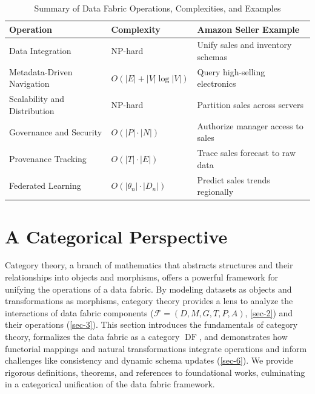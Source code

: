 \documentclass{amsart}
\newcommand\cF{\mathcal{F}}
\DeclareMathOperator\DF{DF}
\begin{document}
\begin{table}[htb]
    \centering
    \begin{tabular}{l l l}
        \hline
        \textbf{Operation} & \textbf{Complexity} & \textbf{Amazon Seller Example} \\
        \hline
        Data Integration & NP-hard & Unify sales and inventory schemas \\
        Metadata-Driven Navigation & \( O(|E| + |V| \log |V|) \) & Query high-selling electronics \\
        Scalability and Distribution & NP-hard & Partition sales across servers \\
        Governance and Security & \( O(|P| \cdot |N|) \) & Authorize manager access to sales \\
        Provenance Tracking & \( O(|T| \cdot |E|) \) & Trace sales forecast to raw data \\
        Federated Learning & \( O(|\theta_n| \cdot |D_n|) \) & Predict sales trends regionally \\
        \hline
    \end{tabular}
    \caption{Summary of Data Fabric Operations, Complexities, and Examples}
    \label{tab:operations}
\end{table}


\section{A Categorical Perspective} \label{sec-4}

Category theory, a branch of mathematics that abstracts structures and their relationships into objects and morphisms, offers a powerful framework for unifying the operations of a data fabric. By modeling datasets as objects and transformations as morphisms, category theory provides a lens to analyze the interactions of data fabric components (\( \cF = (D, M, G, T, P, A) \), \cref{sec-2}) and their operations (\cref{sec-3}). This section introduces the fundamentals of category theory, formalizes the data fabric as a category \( \DF \), and demonstrates how functorial mappings and natural transformations integrate operations and inform challenges like consistency and dynamic schema updates (\cref{sec-6}). We provide rigorous definitions, theorems, and references to foundational works, culminating in a categorical unification of the data fabric framework.

\end{document}
